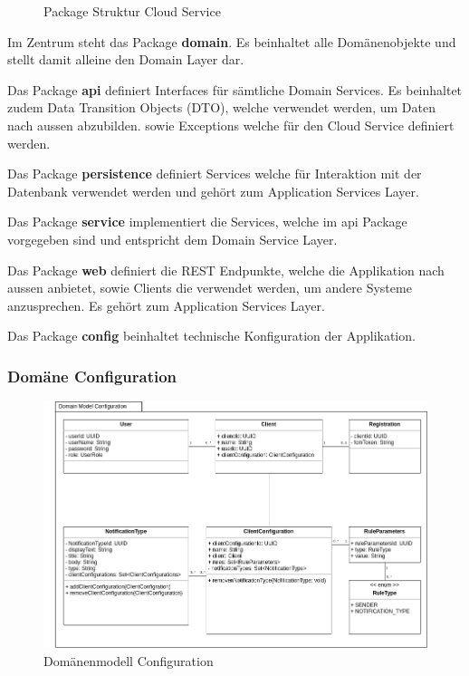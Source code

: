 \begin{figure}[h]
    \centering
    \begin{minipage}[b]{0.9\textwidth}

    \caption{Package Struktur Cloud Service}\label{fig:packagescloudservice}
    \end{minipage}
\end{figure}

Im Zentrum steht das Package \textbf{domain}.
Es beinhaltet alle Domänenobjekte und stellt damit alleine den Domain Layer dar.

Das Package \textbf{api} definiert Interfaces für sämtliche Domain Services.
Es beinhaltet zudem Data Transition Objects (DTO), welche verwendet werden, um Daten nach aussen abzubilden.
sowie Exceptions welche für den Cloud Service definiert werden.

Das Package \textbf{persistence} definiert Services welche für Interaktion mit der Datenbank verwendet werden und gehört zum Application Services Layer.

Das Package \textbf{service} implementiert die Services, welche im api Package vorgegeben sind und entspricht dem Domain Service Layer.

Das Package \textbf{web} definiert die REST Endpunkte, welche die Applikation nach aussen anbietet,
sowie Clients die verwendet werden, um andere Systeme anzusprechen.
Es gehört zum Application Services Layer.

Das Package \textbf{config} beinhaltet technische Konfiguration der Applikation.

\clearpage

\subsubsection{Domäne Configuration}

\begin{figure}[h]
    \centering
    \begin{minipage}[b]{0.9\textwidth}
        \includegraphics[width=\textwidth]{graphics/Class_Configuration_Domain}
        \caption{Domänenmodell Configuration}
    \end{minipage}
\end{figure}

